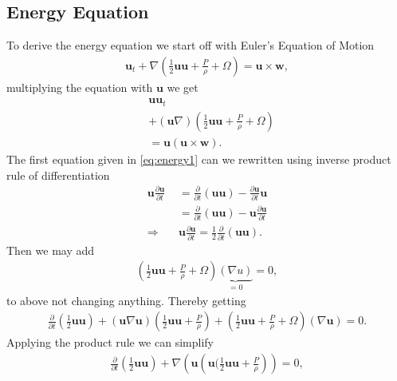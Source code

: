 \subsection{Energy Equation}
To derive the energy equation we start off with Euler's Equation of Motion
\begin{align}
  \mathbf{u} _t + \nabla
  (\frac{1}{2}\mathbf{u}\mathbf{u}+\frac{P}{\rho}+\Omega) = \mathbf{u}\times
  \mathbf{w},
\end{align}
multiplying the equation with $\mathbf{u}$ we get
\begin{align}
  &\mathbf{u}\mathbf{u} _t \label{eq:energy1} \\
  &+(\mathbf{u}\nabla)(\frac{1}{2}\mathbf{u}\mathbf{u}+\frac{P}{\rho}+\Omega)\label{eq:energy2}\\
  &= \mathbf{u}(\mathbf{u}\times
  \mathbf{w})\label{eq:energy3}.
\end{align}
The first equation given in \ref{eq:energy1} can we rewritten using inverse
product rule of differentiation
\begin{align}
    \mathbf{u}\frac{\partial \mathbf{u}}{\partial t}
    &= \frac{\partial
    }{\partial t} (\mathbf{u}\mathbf{u}) - \frac{\partial \mathbf{u}}{\partial t}
    \mathbf{u} \\
    &= \frac{\partial
    }{\partial t} (\mathbf{u}\mathbf{u}) - \mathbf{u}\frac{\partial
    \mathbf{u}}{\partial t}\\
    \Rightarrow\quad & \mathbf{u} \frac{\partial \mathbf{u}}{\partial t}  =
    \frac{1}{2}\frac{\partial }{\partial t} (\mathbf{u}\mathbf{u}).
\end{align}
Then we may add
\begin{align}
    \left(\frac{1}{2} \mathbf{u}\mathbf{u}+\frac{P}{\rho} +\Omega  \right)
    \underbrace{(\nabla u)}_{=0} = 0,
\end{align}
to above not changing anything. Thereby getting
\begin{align}
    \frac{\partial }{\partial t} \left(\frac{1}{2}\mathbf{u}\mathbf{u}\right)
    +(\mathbf{u}\nabla \mathbf{u})\left(
    \frac{1}{2}\mathbf{u}\mathbf{u}+\frac{P}{\rho} \right)
    +\left( \frac{1}{2}\mathbf{u}\mathbf{u}+\frac{P}{\rho} + \Omega \right)
    (\nabla \mathbf{u}) = 0.
\end{align}
Applying the product rule we can simplify
\begin{align}
    \frac{\partial }{\partial t} \left(\frac{1}{2}\mathbf{u}\mathbf{u}\right)
    +\nabla \left(\mathbf{u}\left(\mathbf{u}(
    \frac{1}{2}\mathbf{u}\mathbf{u}+\frac{P}{\rho}\right) \right) = 0,
\end{align}
